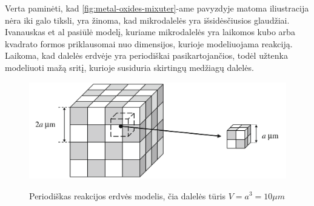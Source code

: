 Verta paminėti, kad \ref{fig:metal-oxides-mixuter}-ame pavyzdyje matoma iliustracija nėra iki galo tiksli, yra žinoma, kad mikrodalelės yra išsidėsčiusios glaudžiai.
\cite{ivanauskasModellingSolidState2005} Ivanauskas et al pasiūlė modelį, kuriame mikrodalelės yra laikomos kubo arba kvadrato formos priklausomai nuo dimensijos, kurioje modeliuojama reakciją. Laikoma, kad dalelės erdvėje yra periodiškai pasikartojančios, todėl užtenka modeliuoti mažą sritį, kurioje susiduria skirtingų medžiagų dalelės. 

\begin{figure}[h]
  \centering
  \caption{Periodiškas reakcijos erdvės modelis, čia dalelės tūris $V=a^3=10\mu m$}
  \includegraphics[width=0.75\linewidth]{assets/periodic-space.png}
  \label{fig:periodic-space}
\end{figure}